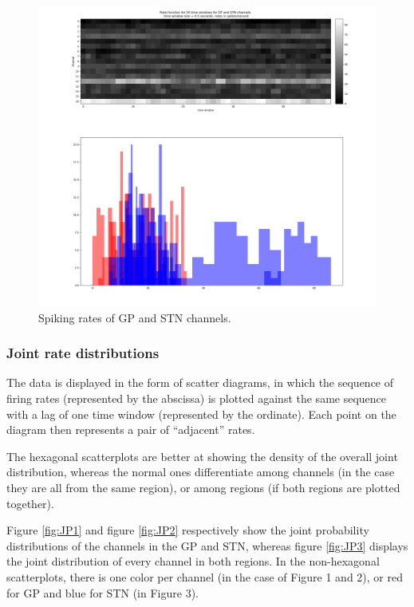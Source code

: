 \documentclass{article}
\begin{document}
\begin{figure}[H]
    \centering
    \centerline{\includegraphics[width=1\textwidth]{images/spiking/SR_all.png}}
    \caption{Spiking rates of GP and STN channels.}
    \label{fig:ratesBoth1}
\end{figure}

\subsubsection{Joint rate distributions}

The data is displayed in the form of scatter diagrams, in which the sequence of firing rates (represented by the abscissa) is plotted against the same sequence with a lag of one time window (represented by the ordinate). 
Each point on the diagram then represents a pair of “adjacent” rates.

The hexagonal scatterplots are better at showing the density of the overall joint distribution, whereas the normal ones differentiate among channels (in the case they are all from the same region), or among regions (if both regions are plotted together).

Figure \ref{fig:JP1} and figure \ref{fig:JP2} respectively show the joint probability distributions of the channels in the GP and STN, whereas figure \ref{fig:JP3} displays the joint distribution of every channel in both regions. 
In the non-hexagonal scatterplots, there is one color per channel (in the case of Figure 1 and 2), or red for GP and blue for STN (in Figure 3).
\end{document}
